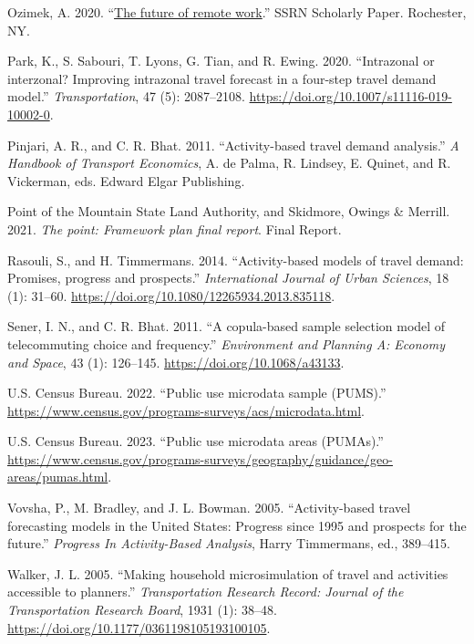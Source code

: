 \documentclass[fancy, oneside, mastersfancy, ms]{byuthesis}
\newlength{\cslhangindent}
\newenvironment{CSLReferences}[2] %
 {\begin{list}{}{%
  \setlength{\itemindent}{0pt}
  \setlength{\leftmargin}{0pt}
  \setlength{\parsep}{0pt}
  \ifodd #1
   \setlength{\leftmargin}{\cslhangindent}
   \setlength{\itemindent}{-1\cslhangindent}
  \fi
  \setlength{\itemsep}{#2\baselineskip}}}
 {\end{list}}
\begin{document}
\begin{CSLReferences}{1}{0}
Ozimek, A. 2020. {``\href{https://doi.org/10.2139/ssrn.3638597}{The
future of remote work}.''} {SSRN Scholarly Paper}. Rochester, NY.

Park, K., S. Sabouri, T. Lyons, G. Tian, and R. Ewing. 2020.
{``Intrazonal or interzonal? {Improving} intrazonal travel forecast in a
four-step travel demand model.''} \emph{Transportation}, 47 (5):
2087--2108. \url{https://doi.org/10.1007/s11116-019-10002-0}.

Pinjari, A. R., and C. R. Bhat. 2011. {``Activity-based travel demand
analysis.''} \emph{A {Handbook} of {Transport Economics}}, A. de Palma,
R. Lindsey, E. Quinet, and R. Vickerman, eds. Edward Elgar Publishing.

Point of the Mountain State Land Authority, and Skidmore, Owings \&
Merrill. 2021. \emph{The point: Framework plan final report}. Final
{Report}.

Rasouli, S., and H. Timmermans. 2014. {``Activity-based models of travel
demand: Promises, progress and prospects.''} \emph{International Journal
of Urban Sciences}, 18 (1): 31--60.
\url{https://doi.org/10.1080/12265934.2013.835118}.

Sener, I. N., and C. R. Bhat. 2011. {``A copula-based sample selection
model of telecommuting choice and frequency.''} \emph{Environment and
Planning A: Economy and Space}, 43 (1): 126--145.
\url{https://doi.org/10.1068/a43133}.

U.S. Census Bureau. 2022. {``Public use microdata sample ({PUMS}).''}
\url{https://www.census.gov/programs-surveys/acs/microdata.html}.

U.S. Census Bureau. 2023. {``Public use microdata areas ({PUMAs}).''}
\url{https://www.census.gov/programs-surveys/geography/guidance/geo-areas/pumas.html}.

Vovsha, P., M. Bradley, and J. L. Bowman. 2005. {``Activity-based travel
forecasting models in the {United States}: Progress since 1995 and
prospects for the future.''} \emph{Progress {In Activity-Based
Analysis}}, Harry Timmermans, ed., 389--415.

Walker, J. L. 2005. {``Making household microsimulation of travel and
activities accessible to planners.''} \emph{Transportation Research
Record: Journal of the Transportation Research Board}, 1931 (1): 38--48.
\url{https://doi.org/10.1177/0361198105193100105}.


\end{CSLReferences}
\end{document}
